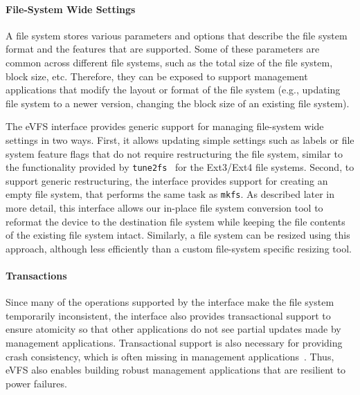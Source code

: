 \vspace{-0.25em}
\paragraph{File-System Wide Settings} A file system stores various parameters and options that describe the file system format and the features that are supported. Some of these parameters are common across different file systems, such as the total size of the file system, block size, etc. Therefore, they can be exposed to support management applications that modify the layout or format of the file system (e.g., updating file system to a newer version, changing the block size of an existing file system).

The eVFS interface provides generic support for managing file-system wide settings in two ways. First, it allows updating simple settings such as labels or file system feature flags that do not require restructuring the file system, similar to the functionality provided by \texttt{tune2fs}~\cite{tso-e2fsprogs} for the Ext3/Ext4 file systems. Second, to support generic restructuring, the interface provides support for creating an empty file system, that performs the same task as \texttt{mkfs}. As described later in more detail, this interface allows our in-place file system conversion tool to reformat the device to the destination file system while keeping the file contents of the existing file system intact. Similarly, a file system can be resized using this approach, although less efficiently than a custom file-system specific resizing tool.

\vspace{-0.4em}
\paragraph{Transactions} Since many of the operations supported by the interface make the file system temporarily inconsistent, the interface also provides transactional support to ensure atomicity so that other applications do not see partial updates made by management applications. Transactional support is also necessary for providing crash consistency, which is often missing in management applications~\cite{gatla2018fsck}. Thus, eVFS also enables building robust management applications that are resilient to power failures.

